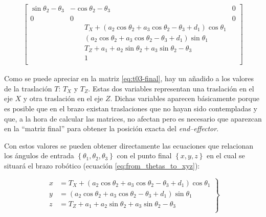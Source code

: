 \begin{align}
{\begin{bmatrix}
        \sin{\theta_{2} - \theta_{3}}                  & - \cos{\theta_{2} - \theta_{3}}                                                                                   & 0                  \\
        0                                              & 0                                                                                                                 & 0                  \\
                                                       & \qquad T_{X} + \left(a_{2} \cos{\theta_{2}} + a_{3} \cos{\theta_{2} - \theta_{3}} + d_{1}\right) \cos{\theta_{1}}                      \\
                                                       & \qquad \left(a_{2} \cos{\theta_{2}} + a_{3} \cos{\theta_{2} - \theta_{3}} + d_{1}\right) \sin{\theta_{1}}                              \\
                                                       & \qquad T_{Z} + a_{1} + a_{2} \sin{\theta_{2}} + a_{3} \sin{\theta_{2} - \theta_{3}}                                                    \\
                                                       & \qquad 1                                                                                                                               \\
    \end{bmatrix}}\label{eq:t03-final}
\end{align}

Como se puede apreciar en la matriz \ref{eq:t03-final}, hay un añadido a los valores
de la traslación $T$: $T_X$ y $T_Z$. Estas dos variables representan una traslación en el
eje $X$ y otra traslación en el eje $Z$. Dichas variables aparecen básicamente
porque es posible que en el brazo existan traslaciones que no hayan sido contempladas
y que, a la hora de calcular las matrices, no afectan pero es necesario que aparezcan
en la ``matriz final'' para obtener la posición exacta del \textit{end--effector}.

Con estos valores se pueden obtener directamente las ecuaciones que relacionan
los ángulos de entrada $\left\{\theta_1, \theta_2, \theta_3\right\}$ con el punto
final $\left\{x, y, z\right\}$ en el cual se situará el brazo robótico (ecuación
\ref{eq:from_thetas_to_xyz}):

\begin{equation}
    \label{eq:from_thetas_to_xyz}
    \left.\begin{aligned}
        x &= T_{X} + \left(a_{2} \cos{\theta_{2}} + a_{3} \cos{\theta_{2} - \theta_{3}} + d_{1}\right) \cos{\theta_{1}} \\
        y &= \left(a_{2} \cos{\theta_{2}} + a_{3} \cos{\theta_{2} - \theta_{3}} + d_{1}\right) \sin{\theta_{1}} \\
        z &= T_{Z} + a_{1} + a_{2} \sin{\theta_{2}} + a_{3} \sin{\theta_{2} - \theta_{3}} \\
    \end{aligned}
    \right\}
\end{equation}

